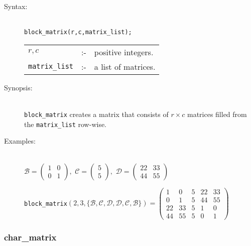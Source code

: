 \begin{description}

\item[Syntax:]\mbox{}\\
\texttt{block\_matrix(r,c,matrix\_list);}\\[2mm]
\begin{tabular}{l l l}
$r,c$          &:-& positive integers. \\
\texttt{matrix\_list} &:-& a list of matrices.
\end{tabular}

\item[Synopsis:]\mbox{}\\
\texttt{block\_matrix} creates a matrix that consists of $r\times c$ matrices
filled from the \texttt{matrix\_list} row-wise.

\item[Examples:]\mbox{}\\
  \(\mathcal{B} = \begin{pmatrix} 1 & 0 \\ 0 & 1 \end{pmatrix}, \,\,
  \mathcal{C} = \begin{pmatrix} 5 \\ 5 \end{pmatrix}, \,\,
  \mathcal{D} = \begin{pmatrix} 22 & 33 \\ 44 & 55 \end{pmatrix}\)

  \texttt{block\_matrix}\((2,3,\{\mathcal{B,C,D,D,C,B}\})  =
  \begin{pmatrix} 1 & 0 & 5 & 22 & 33 \\ 0 & 1 & 5 & 44 & 55 \\
    22 & 33 & 5 & 1 & 0 \\ 44 & 55 & 5 & 0 & 1 \end{pmatrix}\)
\end{description}


\subsubsection{char\_matrix}
\label{linalg:char_matrix}
\hypertarget{operator:CHAR_MATRIX}{}

